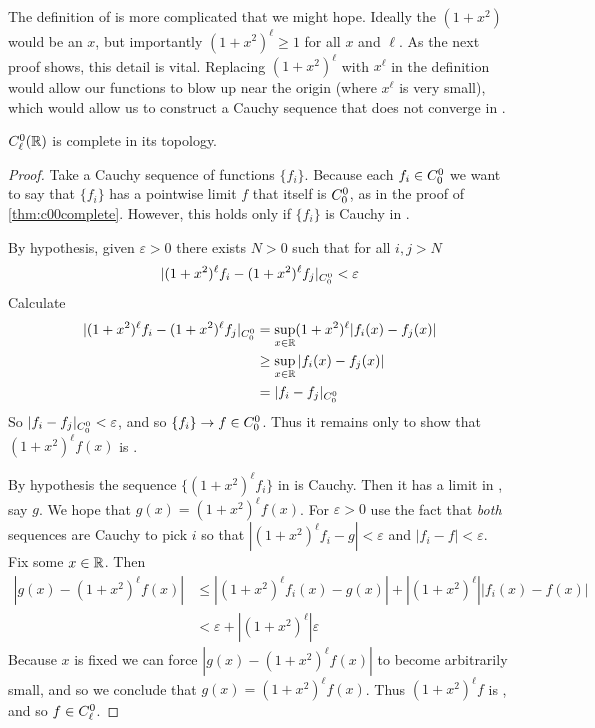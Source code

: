       The definition of \Cl is more complicated that we might hope.
      Ideally the $(1+x^2)$ would be an $x$, but importantly $(1+x^2)^\ell\ge1$ for all $x$ and $\ell$.
      As the next proof shows, this detail is vital.
      Replacing $(1+x^2)^\ell$ with $x^\ell$ in the definition would allow our functions to blow up near the origin (where $x^\ell$ is very small), which would allow us to construct a Cauchy sequence that does not converge in \Cl.
      \begin{thm}
        \label{thm:c0lcomplete}
        ${C^0_\ell}(\mathbb{R})$ is complete in its topology.
      \end{thm}
      \begin{proof}
        Take a Cauchy sequence of \Cl functions $\{f_i\}$.
        Because each $f_i\in {C^0_0}$ we want to say that $\{f_i\}$ has a pointwise limit $f$ that itself is ${C^0_0}$, as in the proof of \cref{thm:c00complete}.
        However, this holds only if $\{f_i\}$ is Cauchy in \Coo. 

        By hypothesis, given $\varepsilon>0$ there exists $N>0$ such that for all $i,j>N$
        \begin{align*}
          |(1+x^2)^\ell f_i - (1+x^2)^\ell f_j|_{C^0_0} < \varepsilon
        \end{align*}
        Calculate 
        \begin{align*}
          |(1+x^2)^\ell f_i - (1+x^2)^\ell f_j|_{C^0_0}
          &= \sup_{x\in\mathbb{R}}(1+x^2)^\ell|f_i(x)-f_j(x)|\\
          &\ge \sup_{x\in\mathbb{R}}|f_i(x)-f_j(x)|\\
          &= |f_i-f_j|_{C^0_0}
        \end{align*}
        So $|f_i-f_j|_{C^0_0}<\varepsilon$, and so $\{f_i\}\rightarrow f\in {C^0_0}$.
        Thus it remains only to show that $(1+x^2)^\ell f(x)$ is \Coo.
        
        By hypothesis the sequence $\{(1+x^2)^\ell f_i\}$ in \Coo is Cauchy.
        Then it has a limit in \Coo, say $g$.
        We hope that $g(x)=(1+x^2)^\ell f(x)$.
        For $\varepsilon>0$ use the fact that \emph{both} sequences are Cauchy to pick $i$ so that $|(1+x^2)^\ell f_i - g|<\varepsilon$ and $|f_i - f|<\varepsilon$.
        Fix some $x\in\mathbb{R}$.
        Then
        \begin{align*}
          |g(x) - (1+x^2)^\ell f(x)| &\le |(1+x^2)^\ell f_i(x) - g(x)|+|(1+x^2)^\ell||f_i(x)-f(x)|\\
          &< \varepsilon + |(1+x^2)^\ell|\varepsilon
        \end{align*}
        Because $x$ is fixed we can force $|g(x)-(1+x^2)^\ell f(x)|$ to become arbitrarily small, and so we conclude that $g(x)=(1+x^2)^\ell f(x)$.
        Thus $(1+x^2)^\ell f$ is \Coo, and so $f\in{C^0_\ell}$.
      \end{proof}

